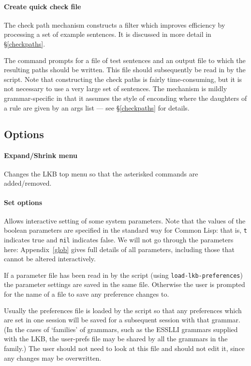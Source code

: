 \documentclass[12pt]{report}
\newcommand{\functionname}[1]{{\tt #1}}
\begin{document}
\paragraph{Create quick check file}
\label{qccreate}

The check path mechanism constructs a filter which improves efficiency
by processing a set of example sentences.  It
is discussed in more detail in \S\ref{checkpaths}.

The command prompts for a file of test sentences and an output file
to which the resulting paths should be written.  This file should
subsequently be read in by the script.  Note that constructing the 
check paths is fairly time-consuming, but it is not necessary
to use a very large set of sentences.  The mechanism is mildly
grammar-specific in that it assumes the style of
enconding where the daughters of a rule are given by an 
{\feature args} list --- see \S\ref{checkpaths} for details.

\subsection{Options}
\label{display}

\paragraph{Expand/Shrink menu} Changes the LKB top menu so that the
asterisked commands are added/removed.

\paragraph{Set options} Allows interactive setting of some system
parameters.
Note that the values of the boolean parameters are specified 
in the standard way for Common Lisp: that is, {\tt t} indicates
true and {\tt nil} indicates false. 
We will not go through the parameters here:
Appendix~\ref{glob} gives full details of all parameters, including those
that cannot be altered interactively. 


If a parameter file has been read in by the script (using 
\functionname{load-lkb-preferences}) the
parameter settings are saved
in the same file.  Otherwise the user is prompted for the name of a file
to save any preference changes to.

Usually the preferences file is loaded by the script so that any preferences 
which are set in one session will be saved for a subsequent session
with that grammar.  (In the cases of `families' of grammars, such as the
ESSLLI grammars supplied with the LKB, the user-prefs file may be
shared by all the grammars in the family.)
The user should not need to look at this file and 
should not edit it, since any changes may be overwritten.
\end{document}

